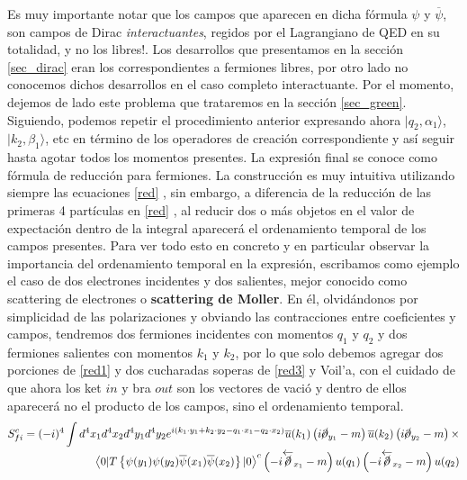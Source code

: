 \documentclass{article}
\numberwithin{equation}{section}
\begin{document}
Es muy importante notar que los campos que aparecen en dicha fórmula $\psi$ y $\overline{\psi}$,
son campos de Dirac \textit{interactuantes}, regidos por el Lagrangiano de
QED en su totalidad, y no los libres!. Los desarrollos que presentamos en la sección \ref{sec_dirac} eran los correspondientes a fermiones libres, por otro lado no conocemos dichos desarrollos en el caso completo interactuante. Por el momento, dejemos de lado este problema que trataremos en la sección \ref{sec_green}.\\

Siguiendo, podemos repetir el procedimiento anterior expresando ahora $ |q_2,\alpha_1 \rangle $, $ | k_2,\beta_{1} \rangle $, etc en término de los operadores de creación correspondiente y así seguir hasta
agotar todos los momentos presentes. La expresión final se conoce como fórmula de reducción
para fermiones. La construcción
es muy intuitiva utilizando siempre las ecuaciones \ref{red} , sin embargo,
a diferencia de la reducción de las primeras 4 partículas en \ref{red} , al reducir dos o más objetos en el valor de expectación dentro de la integral aparecerá el ordenamiento temporal de los campos presentes. Para ver todo esto en concreto y en particular observar
la importancia del ordenamiento temporal en la expresión, escribamos
como ejemplo el caso de dos electrones incidentes y dos salientes,
mejor conocido como scattering de electrones o \textbf{scattering de Moller}.
En él, olvidándonos por simplicidad de las polarizaciones y obviando
las contracciones entre coeficientes y campos, tendremos dos fermiones
incidentes con momentos $q_{1}$ y $q_{2}$ y dos fermiones salientes
con momentos $k_{1}$ y $k_{2}$, por lo que solo debemos agregar dos
porciones de \ref{red1}  y dos cucharadas soperas de \ref{red3}  y Voil'a, con el cuidado
de que ahora los ket $ in $ y bra $ out $ son los vectores de vació y dentro
de ellos aparecerá no el producto de los campos, sino el ordenamiento
temporal.
\begin{equation}\label{Moller}
\begin{aligned}
S_{fi}^{c} =(-i)^{4}\int d^{4}x_{1}d^{4}x_{2}d^{4}y_{1}d^{4}y_{2}e^{i\left(k_{1}\cdot y_{1}+k_{2}\cdot y_{2}-q_{1}\cdot x_{1}-q_{2}\cdot x_{2}\right)}\overline{u}(k_{1})\left(i\cancel{\partial}_{y_{1}}-m\right)\overline{u}(k_{2})\left(i\cancel{\partial}_{y_{2}}-m\right) \times\\
\left\langle 0|T\left\{ \psi(y_{1})\psi(y_{2})\overline{\psi}(x_{1})\overline{\psi}(x_{2})\right\} |0\right\rangle ^{c}\left(-i\overleftarrow{\cancel{\partial}}_{x_{1}}-m\right)u(q_{1})\left(-i\overleftarrow{\cancel{\partial}}_{x_{2}}-m\right)u(q_{2})
\end{aligned}
\end{equation}
\end{document}
